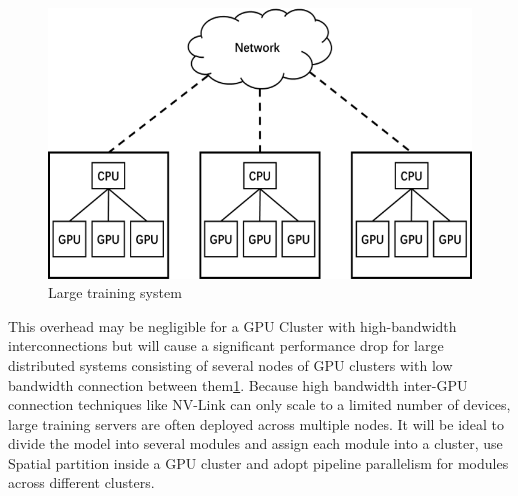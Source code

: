 \documentclass[sigplan]{acmart}\settopmatter{printfolios=true,printccs=false,printacmref=false}
\begin{document}
 \begin{figure}[htbp]
  \centering
  \includegraphics[scale=0.7]{networktopo.png}
  \caption{Large training system}
  \label{fig:networktopo}
\end{figure} This overhead may be negligible for a GPU Cluster with high-bandwidth interconnections but will cause a significant performance drop for large distributed systems consisting of several nodes of GPU clusters with low bandwidth connection between them\ref{fig:networktopo}. Because high bandwidth inter-GPU connection techniques like NV-Link can only scale to a limited number of devices, large training servers are often deployed across multiple nodes. It will be ideal to divide the model into several modules and assign each module into a cluster, use Spatial partition inside a GPU cluster and adopt pipeline parallelism for modules across different clusters.\par
\end{document}
